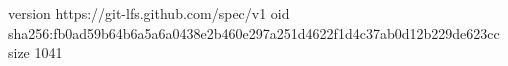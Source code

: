 version https://git-lfs.github.com/spec/v1
oid sha256:fb0ad59b64b6a5a6a0438e2b460e297a251d4622f1d4c37ab0d12b229de623cc
size 1041
